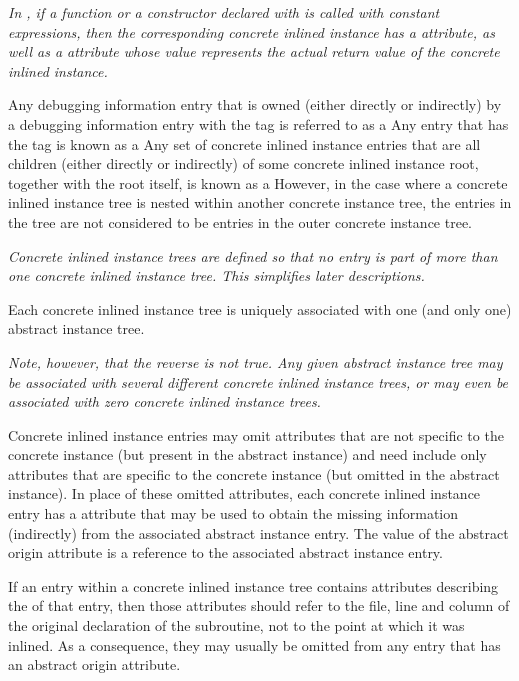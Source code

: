 \textit{In , if a function or a constructor declared with 
is called with constant expressions, then the corresponding
concrete inlined instance has a 
\DWATconstexpr{} attribute,
as well as a \DWATconstvalue{} attribute whose value represents
the actual return value of the concrete inlined instance.}

Any debugging information entry that is owned (either
directly or indirectly) by a debugging information entry
with the tag \DWTAGinlinedsubroutine{} is referred to as a
 Any entry that has
the tag 
\DWTAGinlinedsubroutine{} 
is known as a  
Any set of concrete inlined instance
entries that are all children (either directly or indirectly)
of some concrete inlined instance root, together with the root
itself, is known as a 
However, in the case where a concrete inlined instance tree
is nested within another concrete instance tree, the entries
in the  tree 
are not considered to
be entries in the outer concrete instance tree.

\textit{Concrete inlined instance trees are defined so that no entry
is part of more than one concrete inlined instance tree. This
simplifies later descriptions.}

Each concrete inlined instance tree is uniquely associated
with one (and only one) abstract instance tree.

\textit{Note, however, that the reverse is not true. Any given abstract
instance tree may be associated with several different concrete
inlined instance trees, or may even be associated with zero
concrete inlined instance trees.}

Concrete inlined instance entries may omit attributes that
are not specific to the concrete instance (but present in
the abstract instance) and need include only attributes that
are specific to the concrete instance (but omitted in the
abstract instance). In place of these omitted attributes, each
\hypertarget{chap:DWATabstractorigininlineinstance}{}
concrete inlined instance entry 
has a 
\DWATabstractorigin{}
attribute that may be used to obtain the missing information
(indirectly) from the associated abstract instance entry. The
value of the abstract origin attribute is a reference to the
associated abstract instance entry.

If an entry within a concrete inlined instance tree contains
attributes describing the 
of that entry, then those attributes should refer to the file, line
and column of the original declaration of the subroutine,
not to the point at which it was inlined. As a consequence,
they may usually be omitted from any entry that has an abstract
origin attribute.

